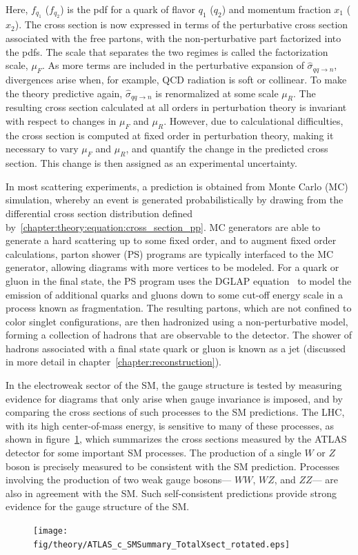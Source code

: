 \noindent
Here, $f_{q_1}$ ($f_{q_2}$) is the pdf for a quark of
flavor $q_1$ ($q_2$) and momentum fraction $x_1$ ($x_2$). The cross
section is now expressed in terms of the perturbative cross section
associated with the free partons, with the non-perturbative part
factorized into the pdfs. The scale that separates the two regimes is
called the factorization scale, $\mu_F$. As more terms are included in
the perturbative expansion of $\hat{\sigma}_{qq\rightarrow{n}}$,
divergences arise when, for example, QCD radiation is soft or
collinear. To make the theory predictive again,
$\hat{\sigma}_{qq\rightarrow{n}}$ is renormalized at some scale
$\mu_R$. The resulting cross section calculated at all orders in
perturbation theory is invariant with respect to changes in $\mu_F$
and $\mu_R$. However, due to calculational difficulties, the cross
section is computed at fixed order in perturbation theory,
making it necessary to vary $\mu_F$ and $\mu_R$, and quantify the
change in the predicted cross section. This change is then assigned as
an experimental uncertainty. 

In most scattering experiments, a prediction is obtained from Monte
Carlo (MC) simulation, whereby an event is generated probabilistically
by drawing from the differential cross section distribution defined
by~\ref{chapter:theory:equation:cross_section_pp}. MC generators are
able to generate a hard scattering up to some fixed order, and to augment
fixed order calculations, parton shower (PS) programs are typically
interfaced to the MC generator, allowing diagrams with more vertices
to be modeled. For a quark or gluon in the final state, the PS program
uses the DGLAP equation~\cite{} to model the emission of additional
quarks and gluons down to some cut-off energy scale in a process known
as fragmentation. The resulting partons, which are not confined to color
singlet configurations, are then hadronized using a non-perturbative
model, forming a collection of hadrons that are observable to the
detector. The shower of hadrons associated with a final state quark or
gluon is known as a jet (discussed in more detail in
chapter~\ref{chapter:reconstruction}).

In the electroweak sector of the SM, the gauge structure is tested by
measuring evidence for diagrams that only arise when gauge
invariance is imposed, and by comparing the cross sections of such
processes to the SM predictions. The LHC, with its high
center-of-mass energy, is sensitive to many of these processes, as
shown in figure~\ref{chap:theory:fig:xs_summary_plot}, which
summarizes the cross sections measured by the ATLAS detector for some
important SM processes. The production of a single $W$ or $Z$ boson is
precisely measured to be consistent with the SM prediction. Processes
involving the production of two weak gauge bosons--- $WW$, $WZ$, and
$ZZ$--- are also in agreement with the SM. Such self-consistent
predictions provide strong evidence for the gauge structure of the
SM. 

\begin{figure}
\centering
\texttt{[image: fig/theory/ATLAS\_c\_SMSummary\_TotalXsect\_rotated.eps]}
\caption{}
\label{chap:theory:fig:xs_summary_plot}
\end{figure} 

